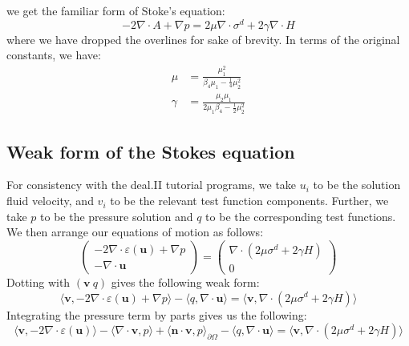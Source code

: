 \documentclass[reqno]{article}
\begin{document}
  we get the familiar form of Stoke's equation:
  \begin{equation}
    - 2\nabla \cdot A
    + \nabla p
    =
    2 \mu \nabla \cdot \sigma^d
    + 2 \gamma \nabla \cdot H
  \end{equation}
  where we have dropped the overlines for sake of brevity.
  In terms of the original constants, we have:
  \begin{equation}
    \begin{split}
      \mu
      &=
      \frac{\mu_1^2}{\beta_4 \mu_1 - \frac14 \mu_2^2} \\
      \gamma
      &=
      \frac{\mu_2 \mu_1}{2 \mu_1 \beta_4 - \frac12 \mu_2^2}
    \end{split}
  \end{equation}

  \subsection{Weak form of the Stokes equation}
  For consistency with the deal.II tutorial programs, we take $u_i$ to be the
  solution fluid velocity, and $v_i$ to be the relevant test function
  components.
  Further, we take $p$ to be the pressure solution and $q$ to be the
  corresponding test functions.
  We then arrange our equations of motion as follows:
  \begin{equation}
    \begin{pmatrix}
      -2 \nabla \cdot \varepsilon(\mathbf{u}) + \nabla p\\
      - \nabla \cdot \mathbf{u}
    \end{pmatrix}
    =
    \begin{pmatrix}
      \nabla \cdot (2 \mu \sigma^d + 2 \gamma H) \\
      0
    \end{pmatrix}
  \end{equation}
  Dotting with $(\mathbf{v} \: q)$ gives the following weak form:
  \begin{equation}
    \langle \mathbf{v}, -2 \nabla \cdot \varepsilon(\mathbf{u}) + \nabla p \rangle
    - \langle q, \nabla \cdot \mathbf{u} \rangle
    =
    \langle \mathbf{v}, \nabla \cdot (2 \mu \sigma^d + 2 \gamma H) \rangle
  \end{equation}
  Integrating the pressure term by parts gives us the following:
  \begin{equation}
    \langle \mathbf{v}, -2 \nabla \cdot \varepsilon(\mathbf{u}) \rangle
    - \langle \nabla \cdot \mathbf{v}, p \rangle
    + \langle \mathbf{n} \cdot \mathbf{v}, p \rangle_{\partial \Omega}
    - \langle q, \nabla \cdot \mathbf{u} \rangle
    =
    \langle \mathbf{v}, \nabla \cdot (2 \mu \sigma^d + 2 \gamma H) \rangle
  \end{equation}
\end{document}
